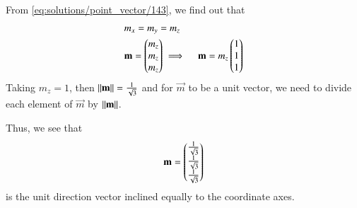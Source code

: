 From \ref{eq:solutions/point_vector/143}, we find out that
\begin{align}
	& m_x = m_y = m_z \\
	& \mathbf{m} = \begin{pmatrix} m_z\\ m_z \\m_z\end{pmatrix}  \implies \quad \mathbf{m} = m_z\begin{pmatrix} 1\\ 1 \\1\end{pmatrix}
\end{align}
Taking $m_z =1$, then $\left\lVert\mathbf{m}\right\rVert = \frac{1}{\sqrt{3}}$ and for $\vec{m}$ to be a unit vector, we need to divide each element of $\vec{m}$ by $\left\lVert\mathbf{m}\right\rVert$.

Thus, we see that  
\begin{align}
	\mathbf{m} = \begin{pmatrix} \frac{1}{\sqrt{3}} \\ \frac{1}{\sqrt{3}} \\ \frac{1}{\sqrt{3}}\end{pmatrix}
\end{align}
is the unit direction vector inclined equally to the coordinate axes.
